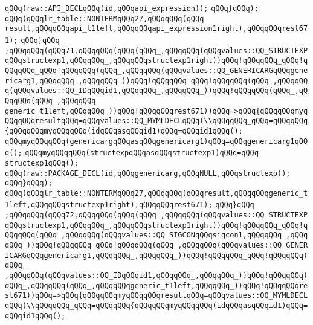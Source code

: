 \verb|qQQq(raw::API_DECLqQQq(id,qQQqapi_expression));|\newline
\verb|qQQq}qQQq);|\newline
\verb|qQQq(qQQqlr_table::NONTERMqQQq27,qQQqqQQq(qQQq|\newline
\verb|result,qQQqqQQqapi_t1left,qQQqqQQqapi_expression1right),qQQqqQQqrest671);|\newline
\verb|qQQq}qQQq|\newline
\verb|;qQQqqQQq(qQQq71,qQQqqQQq(qQQq(qQQq_,qQQqqQQq(qQQqvalues::QQ_STRUCTEXPqQQqstructexp1,qQQqqQQq_,qQQqqQQqstructexp1right))qQQq!qQQqqQQq_qQQq!qQQqqQQq_qQQq!qQQqqQQq(qQQq_,qQQqqQQq(qQQqvalues::QQ_GENERICARGqQQqgenericarg1,qQQqqQQq_,qQQqqQQq_))qQQq!qQQqqQQq_qQQq!qQQqqQQq(qQQq_,qQQqqQQq(qQQqvalues::QQ_IDqQQqid1,qQQqqQQq_,qQQqqQQq_))qQQq!qQQqqQQq(qQQq_,qQQqqQQq(qQQq_,qQQqqQQq|\newline
\verb|generic_t1left,qQQqqQQq_))qQQq!qQQqqQQqrest671))qQQq=>qQQq{qQQqqQQqmyqQQqqQQqresultqQQq=qQQqvalues::QQ_MYMLDECLqQQq(\\qQQqqQQq_qQQq=qQQqqQQq{qQQqqQQqmyqQQqqQQq(idqQQqasqQQqid1)qQQq=qQQqid1qQQq();|\newline
\verb|qQQqmyqQQqqQQq(genericargqQQqasqQQqgenericarg1)qQQq=qQQqgenericarg1qQQq();|\newline
\verb|qQQqmyqQQqqQQq(structexpqQQqasqQQqstructexp1)qQQq=qQQq|\newline
\verb|structexp1qQQq();|\newline
\verb|qQQq(raw::PACKAGE_DECL(id,qQQqgenericarg,qQQqNULL,qQQqstructexp));|\newline
\verb|qQQq}qQQq);|\newline
\verb|qQQq(qQQqlr_table::NONTERMqQQq27,qQQqqQQq(qQQqresult,qQQqqQQqgeneric_t1left,qQQqqQQqstructexp1right),qQQqqQQqrest671);|\newline
\verb|qQQq}qQQq|\newline
\verb|;qQQqqQQq(qQQq72,qQQqqQQq(qQQq(qQQq_,qQQqqQQq(qQQqvalues::QQ_STRUCTEXPqQQqstructexp1,qQQqqQQq_,qQQqqQQqstructexp1right))qQQq!qQQqqQQq_qQQq!qQQqqQQq(qQQq_,qQQqqQQq(qQQqvalues::QQ_SIGCONqQQqsigcon1,qQQqqQQq_,qQQqqQQq_))qQQq!qQQqqQQq_qQQq!qQQqqQQq(qQQq_,qQQqqQQq(qQQqvalues::QQ_GENERICARGqQQqgenericarg1,qQQqqQQq_,qQQqqQQq_))qQQq!qQQqqQQq_qQQq!qQQqqQQq(qQQq_|\newline
\verb|,qQQqqQQq(qQQqvalues::QQ_IDqQQqid1,qQQqqQQq_,qQQqqQQq_))qQQq!qQQqqQQq(qQQq_,qQQqqQQq(qQQq_,qQQqqQQqgeneric_t1left,qQQqqQQq_))qQQq!qQQqqQQqrest671))qQQq=>qQQq{qQQqqQQqmyqQQqqQQqresultqQQq=qQQqvalues::QQ_MYMLDECLqQQq(\\qQQqqQQq_qQQq=qQQqqQQq{qQQqqQQqmyqQQqqQQq(idqQQqasqQQqid1)qQQq=qQQqid1qQQq();|\newline
